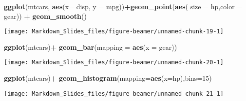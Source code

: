 \documentclass[ignorenonframetext,]{beamer}
\newenvironment{Shaded}{\begin{snugshade}}{\end{snugshade}}
\newcommand{\DataTypeTok}[1]{\textcolor[rgb]{0.13,0.29,0.53}{#1}}
\newcommand{\DecValTok}[1]{\textcolor[rgb]{0.00,0.00,0.81}{#1}}
\newcommand{\KeywordTok}[1]{\textcolor[rgb]{0.13,0.29,0.53}{\textbf{#1}}}
\newcommand{\NormalTok}[1]{#1}
\newcommand{\OperatorTok}[1]{\textcolor[rgb]{0.81,0.36,0.00}{\textbf{#1}}}
\newcommand{\StringTok}[1]{\textcolor[rgb]{0.31,0.60,0.02}{#1}}
\begin{document}
\begin{frame}[fragile]

\begin{Shaded}
\begin{Highlighting}[]
\KeywordTok{ggplot}\NormalTok{(mtcars, }\KeywordTok{aes}\NormalTok{(}\DataTypeTok{x=}\NormalTok{ disp, }\DataTypeTok{y =}\NormalTok{ mpg))}\OperatorTok{+}\KeywordTok{geom_point}\NormalTok{(}\KeywordTok{aes}\NormalTok{(}
  \DataTypeTok{size =}\NormalTok{ hp,}\DataTypeTok{color =}\NormalTok{ gear)) }\OperatorTok{+}\StringTok{ }\KeywordTok{geom_smooth}\NormalTok{()}
\end{Highlighting}
\end{Shaded}

\begin{center}\texttt{[image: Markdown\_Slides\_files/figure-beamer/unnamed-chunk-19-1]} \end{center}

\end{frame}

\begin{frame}[fragile]

\begin{Shaded}
\begin{Highlighting}[]
\KeywordTok{ggplot}\NormalTok{(mtcars)}\OperatorTok{+}\StringTok{ }\KeywordTok{geom_bar}\NormalTok{(}\DataTypeTok{mapping =} \KeywordTok{aes}\NormalTok{(}\DataTypeTok{x =}\NormalTok{ gear))}
\end{Highlighting}
\end{Shaded}

\begin{center}\texttt{[image: Markdown\_Slides\_files/figure-beamer/unnamed-chunk-20-1]} \end{center}

\end{frame}

\begin{frame}[fragile]

\begin{Shaded}
\begin{Highlighting}[]
\KeywordTok{ggplot}\NormalTok{(mtcars)}\OperatorTok{+}\StringTok{ }\KeywordTok{geom_histogram}\NormalTok{(}\DataTypeTok{mapping=}\KeywordTok{aes}\NormalTok{(}\DataTypeTok{x=}\NormalTok{hp),}\DataTypeTok{bins=}\DecValTok{15}\NormalTok{)}
\end{Highlighting}
\end{Shaded}

\begin{center}\texttt{[image: Markdown\_Slides\_files/figure-beamer/unnamed-chunk-21-1]} \end{center}

\end{frame}
\end{document}
